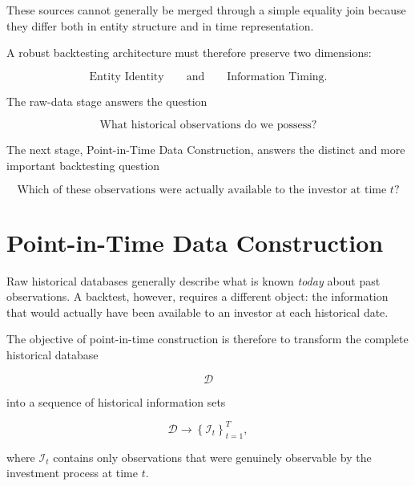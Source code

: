 \documentclass[11pt,a4paper]{article}
\begin{document}
These sources cannot generally be merged through a simple equality join because
they differ both in entity structure and in time representation.

A robust backtesting architecture must therefore preserve two dimensions:

\begin{equation}
\boxed{
\text{Entity Identity}
\qquad\text{and}\qquad
\text{Information Timing}.
}
\end{equation}

The raw-data stage answers the question

\begin{equation}
\boxed{
\text{What historical observations do we possess?}
}
\end{equation}

The next stage, Point-in-Time Data Construction, answers the distinct and more
important backtesting question

\begin{equation}
\boxed{
\text{Which of these observations were actually available to the investor at time }t?
}
\end{equation}


\section{Point-in-Time Data Construction}
\label{sec:point_in_time_data}

Raw historical databases generally describe what is known \emph{today} about
past observations. A backtest, however, requires a different object: the
information that would actually have been available to an investor at each
historical date.

The objective of point-in-time construction is therefore to transform the
complete historical database

\begin{equation}
\mathcal{D}
\end{equation}

into a sequence of historical information sets

\begin{equation}
\boxed{
\mathcal{D}
\longrightarrow
\left\{
\mathcal{I}_t
\right\}_{t=1}^{T},
}
\end{equation}

where $\mathcal{I}_t$ contains only observations that were genuinely observable
by the investment process at time $t$.
\end{document}

